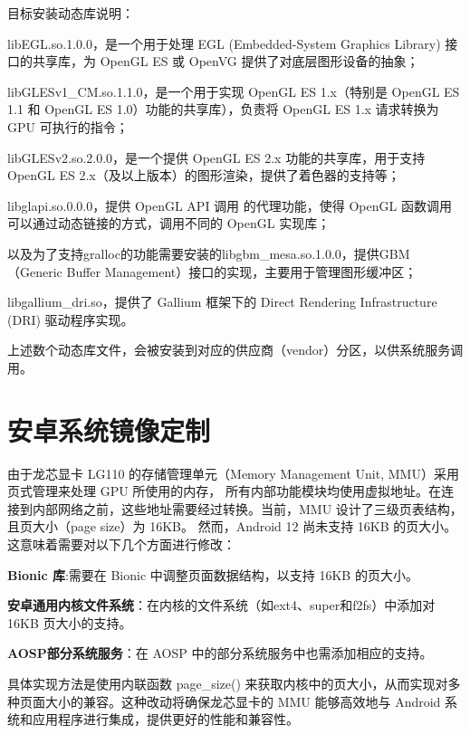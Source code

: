 目标安装动态库说明：

libEGL.so.1.0.0，是一个用于处理 EGL (Embedded-System Graphics Library) 接口的共享库，为 OpenGL ES 或 OpenVG 提供了对底层图形设备的抽象；

libGLESv1\_CM.so.1.1.0，是一个用于实现 OpenGL ES 1.x（特别是 OpenGL ES 1.1 和 OpenGL ES 1.0）功能的共享库），负责将 OpenGL ES 1.x 请求转换为 GPU 可执行的指令；

libGLESv2.so.2.0.0，是一个提供 OpenGL ES 2.x 功能的共享库，用于支持 OpenGL ES 2.x（及以上版本）的图形渲染，提供了着色器的支持等；

libglapi.so.0.0.0，提供 OpenGL API 调用 的代理功能，使得 OpenGL 函数调用可以通过动态链接的方式，调用不同的 OpenGL 实现库；

以及为了支持gralloc的功能需要安装的libgbm\_mesa.so.1.0.0，提供GBM（Generic Buffer Management）接口的实现，主要用于管理图形缓冲区；

libgallium\_dri.so，提供了 Gallium 框架下的 Direct Rendering Infrastructure (DRI) 驱动程序实现。

上述数个动态库文件，会被安装到对应的供应商（vendor）分区，以供系统服务调用。

\section{安卓系统镜像定制}
由于龙芯显卡 LG110 的存储管理单元（Memory Management Unit, MMU）采用页式管理来处理 GPU 所使用的内存，
所有内部功能模块均使用虚拟地址。在连接到内部网络之前，这些地址需要经过转换。当前，MMU 设计了三级页表结构，且页大小（page size）为 16KB。
然而，Android 12 尚未支持 16KB 的页大小。这意味着需要对以下几个方面进行修改：

\textbf{Bionic 库}:需要在 Bionic 中调整页面数据结构，以支持 16KB 的页大小。

\textbf{安卓通用内核文件系统}：在内核的文件系统（如ext4、super和f2fs）中添加对 16KB 页大小的支持。

\textbf{AOSP部分系统服务}：在 AOSP 中的部分系统服务中也需添加相应的支持。

具体实现方法是使用内联函数 page\_size() 来获取内核中的页大小，从而实现对多种页面大小的兼容。这种改动将确保龙芯显卡的 MMU 
能够高效地与 Android 系统和应用程序进行集成，提供更好的性能和兼容性。


